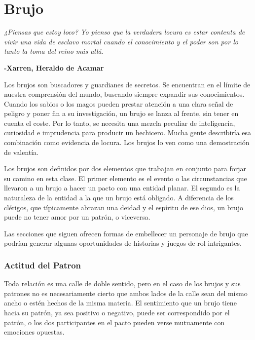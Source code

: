 \documentclass[a4paper,twocolumn,openany,10pt]{dndbook}
\begin{document}
\section{Brujo}
\begin{quotebox}
	\textit{¿Piensas que estoy loco? Yo pienso que la verdadera locura es estar contenta de vivir una vida de esclavo mortal
	cuando el conocimiento y el poder son por lo tanto la toma del reino más allá. }

	\begin{flushright}
	\textbf{-Xarren, Heraldo de Acamar}
	\end{flushright}
\end{quotebox}

Los brujos son buscadores y guardianes de secretos. Se encuentran en el límite de nuestra comprensión del mundo, buscando
siempre expandir sus conocimientos. Cuando los sabios o los magos pueden prestar atención a una clara señal de peligro y poner
fin a su investigación, un brujo se lanza al frente, sin tener en cuenta el coste. Por lo tanto, se necesita una mezcla peculiar
de inteligencia, curiosidad e imprudencia para producir un hechicero. Mucha gente describiría esa combinación como evidencia de
locura. Los brujos lo ven como una demostración de valentía.

Los brujos son definidos por dos elementos que trabajan en conjunto para forjar su camino en esta clase. El primer elemento es
el evento o las circunstancias que llevaron a un brujo a hacer un pacto con una entidad planar. El segundo es la naturaleza de
la entidad a la que un brujo está obligado. A diferencia de los clérigos, que típicamente abrazan una deidad y el espíritu de
ese dios, un brujo puede no tener amor por un patrón, o viceversa.

Las secciones que siguen ofrecen formas de embellecer un personaje de brujo que podrían generar algunas oportunidades de
historias y juegos de rol intrigantes. 

\subsubsection*{Actitud del Patron}
Toda relación es una calle de doble sentido, pero en el caso de los brujos y sus patrones no es necesariamente cierto que ambos
lados de la calle sean del mismo ancho o estén hechos de la misma materia. El sentimiento que un brujo tiene hacia su patrón,
ya sea positivo o negativo, puede ser correspondido por el patrón, o los dos participantes en el pacto pueden verse mutuamente
con emociones opuestas.
\end{document}
